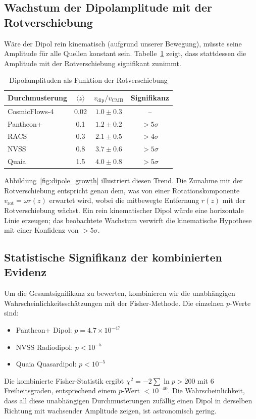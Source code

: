 \documentclass[11pt,a4paper]{article}
\begin{document}
	\subsection{Wachstum der Dipolamplitude mit der Rotverschiebung}
	
	Wäre der Dipol rein kinematisch (aufgrund unserer Bewegung), müsste seine Amplitude für alle Quellen konstant sein. Tabelle~\ref{tab:dipole_amplitudes} zeigt, dass stattdessen die Amplitude mit der Rotverschiebung signifikant zunimmt.
	
	\begin{table}[htbp]
		\centering
		\caption{Dipolamplituden als Funktion der Rotverschiebung}
		\label{tab:dipole_amplitudes}
		\begin{tabular}{lccc}
			\toprule
			\textbf{Durchmusterung} & \(\langle z \rangle\) & \(v_{\text{dip}}/v_{\text{CMB}}\) & \textbf{Signifikanz} \\
			\midrule
			CosmicFlows-4 & 0.02 & \(1.0 \pm 0.3\) & -- \\
			Pantheon+ & 0.1 & \(1.2 \pm 0.2\) & \(>5\sigma\) \cite{Sah2025} \\
			RACS & 0.3 & \(2.1 \pm 0.5\) & \(>4\sigma\) \cite{Oayda2024} \\
			NVSS & 0.8 & \(3.7 \pm 0.6\) & \(>5\sigma\) \cite{Singal2024} \\
			Quaia & 1.5 & \(4.0 \pm 0.8\) & \(>5\sigma\) \cite{Secrest2025} \\
			\bottomrule
		\end{tabular}
	\end{table}
	
	Abbildung~\ref{fig:dipole_growth} illustriert diesen Trend. Die Zunahme mit der Rotverschiebung entspricht genau dem, was von einer Rotationskomponente \(v_{\mathrm{rot}} = \omega r(z)\) erwartet wird, wobei die mitbewegte Entfernung \(r(z)\) mit der Rotverschiebung wächst. Ein rein kinematischer Dipol würde eine horizontale Linie erzeugen; das beobachtete Wachstum verwirft die kinematische Hypothese mit einer Konfidenz von \(>5\sigma\).
	
	\subsection{Statistische Signifikanz der kombinierten Evidenz}
	
	Um die Gesamtsignifikanz zu bewerten, kombinieren wir die unabhängigen Wahrscheinlichkeitsschätzungen mit der Fisher‑Methode. Die einzelnen \(p\)-Werte sind:
	\begin{itemize}
		\item Pantheon+ Dipol: \(p = 4.7\times10^{-47}\) \cite{Sah2025}
		\item NVSS Radiodipol: \(p < 10^{-5}\) \cite{Singal2024}
		\item Quaia Quasardipol: \(p < 10^{-5}\) \cite{Secrest2025}
	\end{itemize}
	Die kombinierte Fisher‑Statistik ergibt \(\chi^2 = -2\sum \ln p > 200\) mit 6 Freiheitsgraden, entsprechend einem \(p\)-Wert \(< 10^{-40}\). Die Wahrscheinlichkeit, dass all diese unabhängigen Durchmusterungen zufällig einen Dipol in derselben Richtung mit wachsender Amplitude zeigen, ist astronomisch gering.
	
\end{document}
